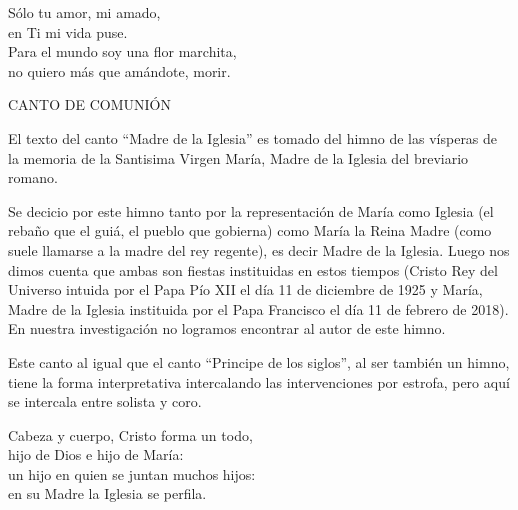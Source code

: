 \documentclass[12pt, letterpaper]{report}
\begin{document}
    \noindent
    S\'olo tu amor, mi amado,\\
    en Ti mi vida puse.\\
    Para el mundo soy una flor marchita,\\
    no quiero m\'as que am\'andote, morir.
    \clearpage




    \begin{center}
      {\large CANTO DE COMUNI\'ON}
    \end{center}

    El texto del canto ``Madre de la Iglesia'' es tomado del himno de las v\'isperas de la memoria de la Santisima Virgen Mar\'ia, Madre de la Iglesia del breviario romano.

    Se decicio por este himno tanto por la representaci\'on de Mar\'ia como Iglesia
    (el reba\~no que el gui\'a, el pueblo que gobierna) como Mar\'ia la Reina Madre (como suele llamarse a la madre del rey regente), es decir Madre de la Iglesia. Luego nos dimos cuenta que ambas son fiestas instituidas en estos tiempos (Cristo Rey del Universo intuida por el Papa P\'io XII el d\'ia 11 de diciembre de 1925 y Mar\'ia, Madre de la Iglesia instituida por el Papa Francisco el d\'ia 11 de febrero de 2018). En nuestra investigaci\'on no logramos encontrar al autor de este himno.

    Este canto al igual que el canto ``Principe de los siglos'', al ser tambi\'en un himno, tiene la forma interpretativa intercalando las intervenciones por estrofa, pero aqu\'i se intercala entre solista y coro.

    \noindent
    Cabeza y cuerpo, Cristo forma un todo,\\
    hijo de Dios e hijo de Mar\'ia:\\
    un hijo en quien se juntan muchos hijos:\\
    en su Madre la Iglesia se perfila.
\end{document}
